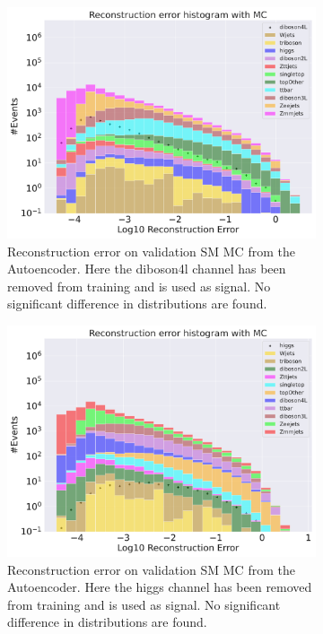\begin{figure}[h!]
    \centering
    \begin{subfigure}{.8\textwidth}
        \includegraphics[width=\textwidth]{Figures/AE_testing/small/b_data_recon_big_rm3_feats_sig_diboson4L.pdf}
        \caption{Reconstruction error on validation SM MC from the Autoencoder. Here the diboson4l channel has been removed from training and 
        is used as signal. No significant difference in distributions are found. }
        \label{fig:ae_small_diboson4l}
    \end{subfigure}
    \hfill
    \begin{subfigure}{.8\textwidth}
        \includegraphics[width=\textwidth]{Figures/AE_testing/small/b_data_recon_big_rm3_feats_sig_higgs.pdf}
        \caption{Reconstruction error on validation SM MC from the Autoencoder. Here the higgs channel has been removed from training and 
        is used as signal. No significant difference in distributions are found.}
        \label{fig:ae_small_higgs}
    \end{subfigure}
    \hfill        
    \caption{ }
    \label{fig:ae_small_channel2}
\end{figure}

